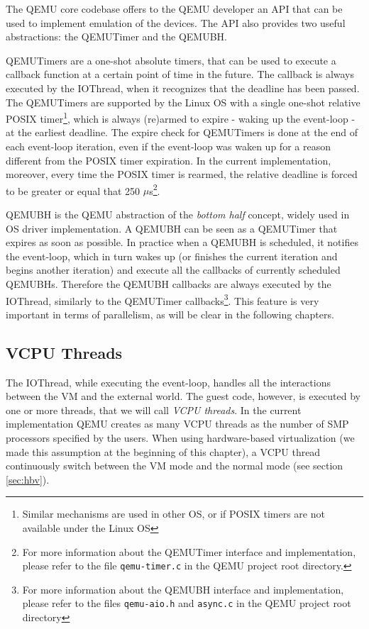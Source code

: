 The QEMU core codebase offers to the QEMU developer an API that can be used to implement emulation of the devices.
The API also provides two useful abstractions: the QEMUTimer and the QEMUBH. 

QEMUTimers are a one-shot absolute timers, that can be 
used to execute a callback function at a certain point of time in the future. The callback is always executed by the IOThread, when it
recognizes that the deadline has been passed. The QEMUTimers are supported
by the Linux OS with a single one-shot relative POSIX timer\footnote{Similar mechanisms are used in other OS, or if POSIX timers are not
available under the Linux OS}, which is always (re)armed to expire - waking up the event-loop - at
the earliest deadline. The expire check for QEMUTimers is done at the end of each event-loop iteration, even if the event-loop was 
waken up for a reason different from the POSIX timer expiration. In the current implementation, moreover, every time the POSIX timer
is rearmed, the relative deadline is forced to be greater or equal that 250 $\mu$s\footnote{For more information about the QEMUTimer
interface and implementation, please refer to the file \texttt{qemu-timer.c} in the QEMU project root directory.}.

\vspace{0.5cm}

QEMUBH is the QEMU abstraction of the \emph{bottom half} concept, widely used in OS driver implementation. A QEMUBH can be seen as
a QEMUTimer that expires as soon as possible. In practice when a QEMUBH is scheduled, it notifies the event-loop, which in turn 
wakes up (or finishes the current iteration and begins another iteration) and execute all the callbacks of currently scheduled QEMUBHs.
Therefore the QEMUBH callbacks are always executed by the IOThread, similarly to the QEMUTimer callbacks\footnote{For more information
about the QEMUBH interface and implementation, please refer to the files \texttt{qemu-aio.h} and \texttt{async.c} in the QEMU project
root directory}. This feature is very important in terms of parallelism, as will be clear in the following chapters.

\subsection{VCPU Threads}
The IOThread, while executing the event-loop, handles all the interactions between the VM and the external world.
The guest code, however, is executed by one or more threads, that we will call \emph{VCPU threads}. In the current implementation QEMU
creates as many VCPU threads as the number of SMP processors specified by the users.
When using hardware-based virtualization (we made this assumption at the beginning of this chapter), a VCPU thread continuously
switch between the VM mode and the normal mode (see section \ref{sec:hbv}).

